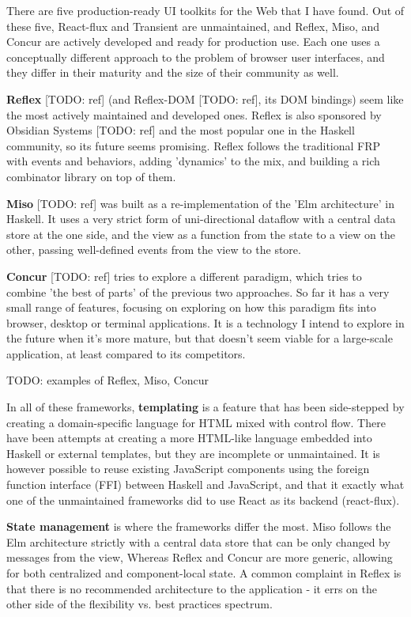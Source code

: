 \documentclass[english,odsaz]{fitthesis}
\begin{document}
There are five production-ready UI toolkits for the Web that I have found. Out
of these five, React-flux and Transient are unmaintained, and Reflex, Miso, and
Concur are actively developed and ready for production use. Each one uses a
conceptually different approach to the problem of browser user interfaces, and
they differ in their maturity and the size of their community as well.

\textbf{Reflex} [TODO: ref] (and Reflex-DOM [TODO: ref], its DOM bindings) seem like the
most actively maintained and developed ones. Reflex is also sponsored by
Obsidian Systems [TODO: ref] and the most popular one in the Haskell community,
so its future seems promising. Reflex follows the traditional FRP with events
and behaviors, adding 'dynamics' to the mix, and building a rich combinator
library on top of them.

\textbf{Miso} [TODO: ref] was built as a re-implementation of the 'Elm architecture' in
Haskell. It uses a very strict form of uni-directional dataflow with a central
data store at the one side, and the view as a function from the state to a view
on the other, passing well-defined events from the view to the store.

\textbf{Concur} [TODO: ref] tries to explore a different paradigm, which tries to combine
'the best of parts' of the previous two approaches. So far it has a very small
range of features, focusing on exploring on how this paradigm fits into browser,
desktop or terminal applications. It is a technology I intend to explore in the
future when it's more mature, but that doesn't seem viable for a large-scale
application, at least compared to its competitors.

TODO: examples of Reflex, Miso, Concur

In all of these frameworks, \textbf{templating} is a feature that has been side-stepped
by creating a domain-specific language for HTML mixed with control flow. There
have been attempts at creating a more HTML-like language embedded into Haskell
or external templates, but they are incomplete or unmaintained. It is however
possible to reuse existing JavaScript components using the foreign function
interface (FFI) between Haskell and JavaScript, and that it exactly what one of
the unmaintained frameworks did to use React as its backend (react-flux).

\textbf{State management} is where the frameworks differ the most. Miso follows the Elm
architecture strictly with a central data store that can be only changed by
messages from the view, Whereas Reflex and Concur are more generic, allowing for
both centralized and component-local state. A common complaint in Reflex is that
there is no recommended architecture to the application - it errs on the other
side of the flexibility vs. best practices spectrum.
\end{document}
